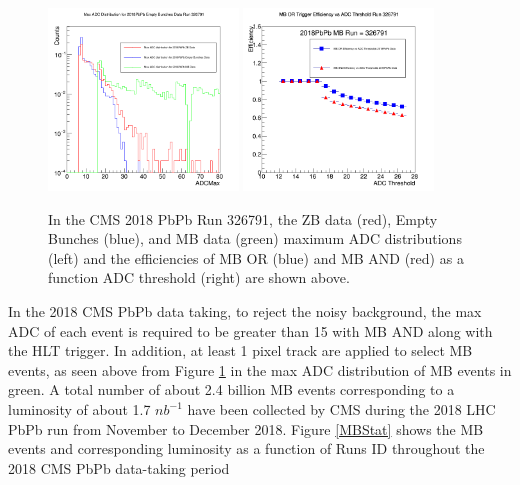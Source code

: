 \begin{figure}[hbtp]
\begin{center}
\includegraphics[width=0.45\textwidth]{Figures/Chapter3/MaxADC.png}
\includegraphics[width=0.45\textwidth]{Figures/Chapter3/MBTrgEffADC.png}
\caption{In the CMS 2018 PbPb Run 326791, the ZB data (red), Empty Bunches (blue), and MB data (green) maximum ADC distributions (left) and the efficiencies of MB OR (blue) and MB AND (red) as a function ADC threshold (right) are shown above.}
\label{2018PbPbMB}
\end{center}
\end{figure} 

In the 2018 CMS PbPb data taking, to reject the noisy background, the max ADC of each event is required to be greater than 15 with MB AND along with the HLT trigger. In addition, at least 1 pixel track are applied to select MB events, as seen above from Figure \ref{2018PbPbMB} in the max ADC distribution of MB events in green. A total number of about 2.4 billion MB events corresponding to a luminosity of about 1.7 $nb^{-1}$ have been collected by CMS during the 2018 LHC PbPb run from November to December 2018. Figure \ref{MBStat} shows the MB events and corresponding luminosity as a function of Runs ID throughout the 2018 CMS PbPb data-taking period

